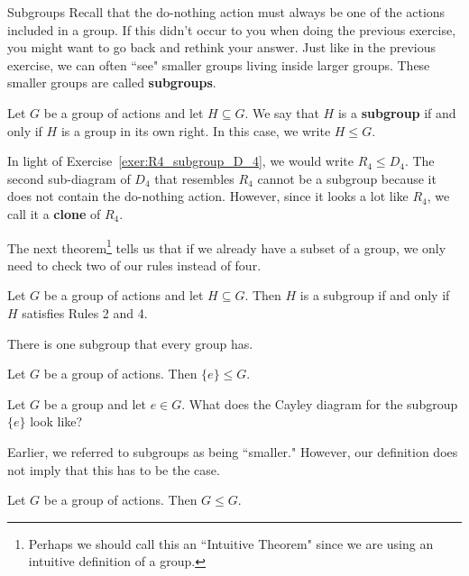 \begin{section}{Subgroups}
Recall that the do-nothing action must always be one of the actions included in a group.  If this didn't occur to you when doing the previous exercise, you might want to go back and rethink your answer.  Just like in the previous exercise, we can often ``see" smaller groups living inside larger groups.  These smaller groups are called \textbf{subgroups}.

\begin{intuitivedef}
Let $G$ be a group of actions and let $H\subseteq G$.  We say that $H$ is a \textbf{subgroup} if and only if $H$ is a group in its own right.  In this case, we write $H\leq G$.
\end{intuitivedef}

In light of Exercise~\ref{exer:R4_subgroup_D_4}, we would write $R_4\leq D_4$.  The second sub-diagram of $D_4$ that resembles $R_4$ cannot be a subgroup because it does not contain the do-nothing action.  However, since it looks a lot like $R_4$, we call it a \textbf{clone} of $R_4$.

The next theorem\footnote{Perhaps we should call this an ``Intuitive Theorem" since we are using an intuitive definition of a group.} tells us that if we already have a subset of a group, we only need to check two of our rules instead of four.

\begin{theorem}
Let $G$ be a group of actions and let $H\subseteq G$. Then $H$ is a subgroup if and only if $H$ satisfies Rules 2 and 4.%
\end{theorem}

There is one subgroup that every group has.

\begin{theorem}
Let $G$ be a group of actions.  Then $\{e\}\leq G$.
\end{theorem}

\begin{exercise}
Let $G$ be a group and let $e\in G$.  What does the Cayley diagram for the subgroup $\{e\}$ look like?
\end{exercise}

Earlier, we referred to subgroups as being ``smaller."  However, our definition does not imply that this has to be the case.

\begin{theorem}
Let $G$ be a group of actions.  Then $G\leq G$.
\end{theorem}


\end{section}
